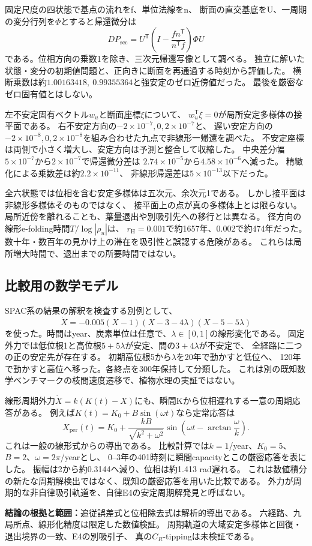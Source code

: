 \documentclass[a4paper,11pt]{ltjsarticle}
\newcommand{\tr}{^{\mathsf T}}
\newcommand{\evidence}[1]{\par\smallskip\noindent\textbf{結論の根拠と範囲：}#1\par\smallskip}
\begin{document}
固定尺度の四状態で基点の流れをf、単位法線をn、
断面の直交基底をU、一周期の変分行列を$\Phi$とすると帰還微分は
\begin{equation}
 DP_{\mathrm{sec}}=
 U\tr\left(I-\frac{fn\tr}{n\tr f}\right)\Phi U
\end{equation}
である。位相方向の乗数1を除き、三次元帰還写像として調べる。
独立に解いた状態・変分の初期値問題と、正向きに断面を再通過する時刻から評価した。
横断乗数は約$1.00163418,\ 0.99355364$と強安定のゼロ近傍値だった。
最後を厳密なゼロ固有値とはしない。

左不安定固有ベクトル$w_u$と断面座標$\xi$について、
$w_u\tr\xi=0$が局所安定多様体の接平面である。
右不安定方向の$-2\times10^{-7},0,2\times10^{-7}$と、
遅い安定方向の$-2\times10^{-8},0,2\times10^{-8}$を組み合わせた九点で非線形一帰還を調べた。
不安定座標は両側で小さく増大し、安定方向は予測と整合して収縮した。
中央差分幅$5\times10^{-7}$から$2\times10^{-7}$で帰還微分差は
$2.74\times10^{-5}$から$4.58\times10^{-6}$へ減った。
精緻化による乗数差は約$2.2\times10^{-11}$、
非線形帰還差は$5\times10^{-13}$以下だった。

全六状態では位相を含む安定多様体は五次元、余次元1である。
しかし接平面は非線形多様体そのものではなく、
接平面上の点が真の多様体上とは限らない。
局所近傍を離れることも、葉量退出や別吸引先への移行とは異なる。
径方向の線形e-folding時間$T/\log|\rho_u|$は、
$r_{\mathrm H}=0.001$で約1657年、0.002で約474年だった。
数十年・数百年の見かけ上の滞在を吸引性と誤認する危険がある。
これらは局所増大時間で、退出までの所要時間ではない。

\subsection{比較用の数学モデル}
SPAC系の結果の解釈を検査する別例として、
\begin{equation}
 \dot X=-0.005(X-1)(X-3-4\lambda)(X-5-5\lambda)
\end{equation}
を使った。時間はyear、炭素単位は任意で、$\lambda\in[0,1]$の線形変化である。
固定外力では低位根1と高位根$5+5\lambda$が安定、間の$3+4\lambda$が不安定で、
全経路に二つの正の安定先が存在する。
初期高位根5から$\lambda$を20年で動かすと低位へ、
120年で動かすと高位へ移った。各終点を300年保持して分類した。
これは別の既知数学ベンチマークの枝間速度遷移で、植物水理の実証ではない。

線形周期外力$\dot X=k(K(t)-X)$にも、瞬間Kから位相遅れする一意の周期応答がある。
例えば$K(t)=K_0+B\sin(\omega t)$なら定常応答は
\begin{equation}
 X_{\mathrm{per}}(t)=K_0+
 \frac{kB}{\sqrt{k^2+\omega^2}}\sin\left(\omega t-\arctan\frac{\omega}{k}\right).
\end{equation}
これは一般の線形式からの導出である。
比較計算では$k=1$/year、$K_0=5$、$B=2$、$\omega=2\pi$/yearとし、
0--3年の401時刻に瞬間capacityとこの厳密応答を表にした。
振幅は2から約0.3144へ減り、位相は約1.413 rad遅れる。
これは数値積分の新たな周期解検出ではなく、既知の厳密応答を用いた比較である。
外力が周期的な非自律吸引軌道を、自律E4の安定周期解発見と呼ばない。
\evidence{追従誤差式と位相除去式は解析的導出である。
六経路、九局所点、線形化精度は限定した数値検証。
周期軌道の大域安定多様体と回復・退出境界の一致、E4の別吸引子、
真の$C_R$-tippingは未検証である。}
\end{document}
